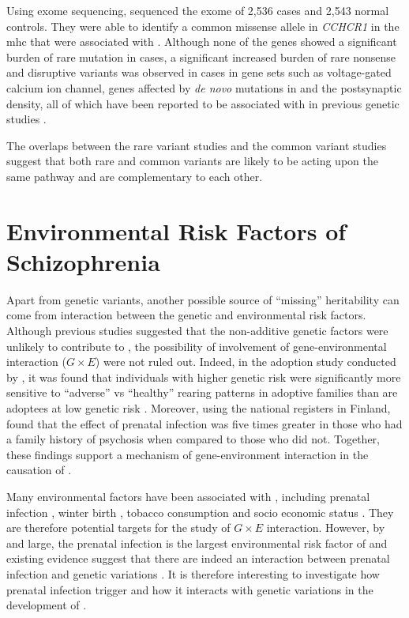 	Using exome sequencing, \citet{Purcell2014} sequenced the exome of 2,536  cases and 2,543 normal controls. 
	They were able to identify a common missense allele in \textit{CCHCR1} in the \gls{mhc} that were associated with .
	Although none of the genes showed a significant burden of rare mutation in cases, a significant increased burden of rare nonsense and disruptive variants was observed in cases in gene sets such as voltage-gated calcium ion channel, genes affected by \textit{de novo} mutations in  \citep{Fromer2014} and the postsynaptic density, all of which have been reported to be associated with  in previous genetic studies \citep{Ripke2014}.

	The overlaps between the rare variant studies and the common variant studies suggest that both rare and common variants are likely to be acting upon the same pathway and are complementary to each other.
	
	\section{Environmental Risk Factors of Schizophrenia}
	Apart from genetic variants, another possible source of ``missing'' heritability can come from interaction between the genetic and environmental risk factors.
	Although previous studies \citep{Gottesman01071967} suggested that the non-additive genetic factors were unlikely to contribute to , the possibility of involvement of gene-environmental interaction ($G\times E$) were not ruled out.
	Indeed, in the adoption study conducted by \citet{Tienari2004}, it was found that individuals with higher genetic risk were significantly more sensitive to ``adverse'' vs ``healthy'' rearing patterns in adoptive families than are adoptees at low genetic risk \citep{Tienari2004}.
	Moreover, using the national registers in Finland, \citet{Clarke2009} found that the effect of prenatal infection was five times greater in those who had a family history of psychosis when compared to those who did not. 
	Together, these findings support a mechanism of gene-environment interaction in the causation of .
	
	Many environmental factors have been associated with , including prenatal infection \citep{Brown2010}, winter birth \citep{OCallaghan1991}, tobacco consumption \citep{Kelly1999} and socio economic status \citep{McGrath2008a}.
	They are therefore potential targets for the study of $G\times E$ interaction.
	However, by and large, the prenatal infection is the largest environmental risk factor of  and existing evidence suggest that there are indeed an interaction between prenatal infection and genetic variations \citep{Clarke2009}.
	It is therefore interesting to investigate how prenatal infection trigger  and how it interacts with genetic variations in the development of .	
	
